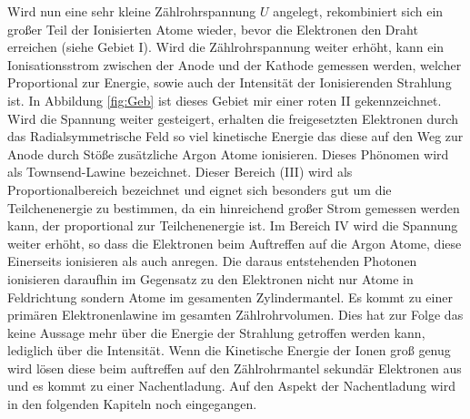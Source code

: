 Wird nun eine sehr kleine Zählrohrspannung $U$ angelegt, rekombiniert sich ein großer Teil der Ionisierten Atome wieder, bevor die Elektronen den Draht erreichen (siehe Gebiet I). Wird die Zählrohrspannung weiter erhöht, kann ein Ionisationsstrom zwischen der Anode und der Kathode gemessen werden, welcher Proportional zur Energie, sowie auch der Intensität der Ionisierenden Strahlung ist. In Abbildung \ref{fig:Geb} ist dieses Gebiet mir einer roten II gekennzeichnet. Wird die Spannung weiter gesteigert, erhalten die freigesetzten Elektronen durch das Radialsymmetrische Feld so viel kinetische Energie das diese auf den Weg zur Anode durch Stöße zusätzliche Argon Atome ionisieren. Dieses Phönomen wird als Townsend-Lawine bezeichnet. Dieser Bereich (III) wird als Proportionalbereich bezeichnet und eignet sich besonders gut um die Teilchenenergie zu bestimmen, da ein hinreichend großer Strom gemessen werden kann, der proportional zur Teilchenenergie ist. Im Bereich IV wird die Spannung weiter erhöht, so dass die Elektronen beim Auftreffen auf die Argon Atome, diese Einerseits ionisieren als auch anregen. Die daraus entstehenden Photonen ionisieren daraufhin im Gegensatz zu den Elektronen nicht nur Atome in Feldrichtung sondern Atome im gesamenten Zylindermantel. Es kommt zu einer primären Elektronenlawine im gesamten Zählrohrvolumen. Dies hat zur Folge das keine Aussage mehr über die Energie der Strahlung getroffen werden kann, lediglich über die Intensität. Wenn die Kinetische Energie der Ionen groß genug wird lösen diese beim auftreffen auf den Zählrohrmantel sekundär Elektronen aus und es kommt zu einer Nachentladung. Auf den Aspekt der Nachentladung wird in den folgenden Kapiteln noch eingegangen.


